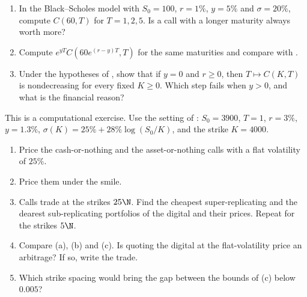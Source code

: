 \begin{exercise}\label{ex:sk-calendar}
\medium
\begin{enumerate}[label=(\alph*)]
  \item In the Black--Scholes model with $S_0=100$, $r=1\%$, $y=5\%$ and $\sigma=20\%$, compute
    $C(60,T)$ for $T=1,2,5$. Is a call with a longer maturity always worth more?
  \item Compute $e^{yT}C(60e^{(r-y)T},T)$ for the same maturities and compare with
    .
  \item Under the hypotheses of , show that if $y=0$ and $r\ge0$, then
    $T\mapsto C(K,T)$ is nondecreasing for every fixed $K\ge0$. Which step fails when $y>0$, and what is
    the financial reason?
\end{enumerate}
\end{exercise}

\begin{exercise}\label{ex:sk-digital-grid}
\medium This is a computational exercise. Use the setting of : $S_0=3900$,
$T=1$, $r=3\%$, $y=1.3\%$, $\sigma(K)=25\%+28\%\log(S_0/K)$, and the strike $K=4000$.
\begin{enumerate}[label=(\alph*)]
  \item Price the cash-or-nothing and the asset-or-nothing calls with a flat volatility of $25\%$.
  \item Price them under the smile.
  \item Calls trade at the strikes $25\N$. Find the cheapest super-replicating and the dearest
    sub-replicating portfolios of the digital and their prices. Repeat for the strikes $5\N$.
  \item Compare (a), (b) and (c). Is quoting the digital at the flat-volatility price an arbitrage? If
    so, write the trade.
  \item Which strike spacing would bring the gap between the bounds of (c) below $0.005$?
\end{enumerate}
\end{exercise}

